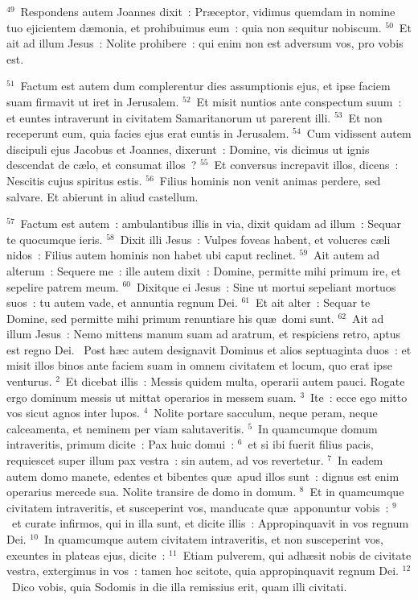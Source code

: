 ${}^{49}$~Respondens autem Joannes dixit~: Pr\ae ceptor, vidimus quemdam in nomine tuo ejicientem d\ae monia, et prohibuimus eum~: quia non sequitur nobiscum.
${}^{50}$~Et ait ad illum Jesus~: Nolite prohibere~: qui enim non est adversum vos, pro vobis est.


${}^{51}$~Factum est autem dum complerentur dies assumptionis ejus, et ipse faciem suam firmavit ut iret in Jerusalem.
${}^{52}$~Et misit nuntios ante conspectum suum~: et euntes intraverunt in civitatem Samaritanorum ut parerent illi.
${}^{53}$~Et non receperunt eum, quia facies ejus erat euntis in Jerusalem.
${}^{54}$~Cum vidissent autem discipuli ejus Jacobus et Joannes, dixerunt~: Domine, vis dicimus ut ignis descendat de c\ae lo, et consumat illos~?
${}^{55}$~Et conversus increpavit illos, dicens~: Nescitis cujus spiritus estis.
${}^{56}$~Filius hominis non venit animas perdere, sed salvare. Et abierunt in aliud castellum.


${}^{57}$~Factum est autem~: ambulantibus illis in via, dixit quidam ad illum~: Sequar te quocumque ieris.
${}^{58}$~Dixit illi Jesus~: Vulpes foveas habent, et volucres c\ae li nidos~: Filius autem hominis non habet ubi caput reclinet.
${}^{59}$~Ait autem ad alterum~: Sequere me~: ille autem dixit~: Domine, permitte mihi primum ire, et sepelire patrem meum.
${}^{60}$~Dixitque ei Jesus~: Sine ut mortui sepeliant mortuos suos~: tu autem vade, et annuntia regnum Dei.
${}^{61}$~Et ait alter~: Sequar te Domine, sed permitte mihi primum renuntiare his qu\ae\ domi sunt.
${}^{62}$~Ait ad illum Jesus~: Nemo mittens manum suam ad aratrum, et respiciens retro, aptus est regno Dei.
~Post h\ae c autem designavit Dominus et alios septuaginta duos~: et misit illos binos ante faciem suam in omnem civitatem et locum, quo erat ipse venturus.
${}^{2}$~Et dicebat illis~: Messis quidem multa, operarii autem pauci. Rogate ergo dominum messis ut mittat operarios in messem suam.
${}^{3}$~Ite~: ecce ego mitto vos sicut agnos inter lupos.
${}^{4}$~Nolite portare sacculum, neque peram, neque calceamenta, et neminem per viam salutaveritis.
${}^{5}$~In quamcumque domum intraveritis, primum dicite~: Pax huic domui~:
${}^{6}$~et si ibi fuerit filius pacis, requiescet super illum pax vestra~: sin autem, ad vos revertetur.
${}^{7}$~In eadem autem domo manete, edentes et bibentes qu\ae\ apud illos sunt~: dignus est enim operarius mercede sua. Nolite transire de domo in domum.
${}^{8}$~Et in quamcumque civitatem intraveritis, et susceperint vos, manducate qu\ae\ apponuntur vobis~:
${}^{9}$~et curate infirmos, qui in illa sunt, et dicite illis~: Appropinquavit in vos regnum Dei.
${}^{10}$~In quamcumque autem civitatem intraveritis, et non susceperint vos, exeuntes in plateas ejus, dicite~:
${}^{11}$~Etiam pulverem, qui adh\ae sit nobis de civitate vestra, extergimus in vos~: tamen hoc scitote, quia appropinquavit regnum Dei.
${}^{12}$~Dico vobis, quia Sodomis in die illa remissius erit, quam illi civitati.


